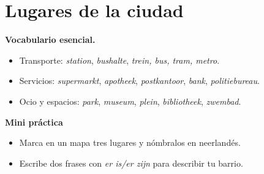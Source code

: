 \section{Lugares de la ciudad}
\textbf{Vocabulario esencial.}
\begin{itemize}[leftmargin=*]
  \item Transporte: \textit{station}, \textit{bushalte}, \textit{trein, bus, tram, metro}.
  \item Servicios: \textit{supermarkt}, \textit{apotheek}, \textit{postkantoor}, \textit{bank}, \textit{politiebureau}.
  \item Ocio y espacios: \textit{park}, \textit{museum}, \textit{plein}, \textit{bibliotheek}, \textit{zwembad}.
\end{itemize}

\textbf{Mini práctica}
\begin{itemize}[leftmargin=*]
  \item Marca en un mapa tres lugares y nómbralos en neerlandés.
  \item Escribe dos frases con \textit{er is/er zijn} para describir tu barrio.
\end{itemize}
